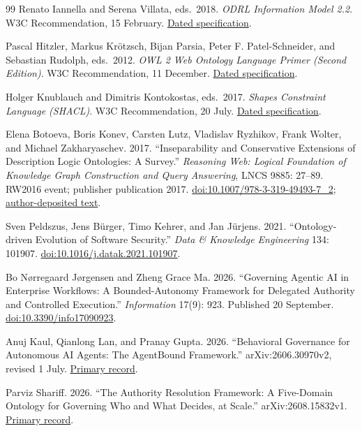 \documentclass[
  english,
  12pt,
  a4paper,
  preprint,
  numbers,
  nopreprintline]{elsarticle}
\begin{document}
\begin{thebibliography}{99}
Renato Iannella and Serena Villata, eds.~2018. \emph{ODRL Information
Model 2.2}. W3C Recommendation, 15 February.
\href{https://www.w3.org/TR/2018/REC-odrl-model-20180215/}{Dated
specification}.

Pascal Hitzler, Markus Krötzsch, Bijan Parsia, Peter F. Patel-Schneider,
and Sebastian Rudolph, eds.~2012. \emph{OWL 2 Web Ontology Language
Primer (Second Edition)}. W3C Recommendation, 11 December.
\href{https://www.w3.org/TR/2012/REC-owl2-primer-20121211/}{Dated
specification}.

Holger Knublauch and Dimitris Kontokostas, eds.~2017. \emph{Shapes
Constraint Language (SHACL)}. W3C Recommendation, 20 July.
\href{https://www.w3.org/TR/2017/REC-shacl-20170720/}{Dated
specification}.

Elena Botoeva, Boris Konev, Carsten Lutz, Vladislav Ryzhikov, Frank
Wolter, and Michael Zakharyaschev. 2017. ``Inseparability and
Conservative Extensions of Description Logic Ontologies: A Survey.''
\emph{Reasoning Web: Logical Foundation of Knowledge Graph Construction
and Query Answering}, LNCS 9885: 27--89. RW2016 event; publisher
publication 2017.
\href{https://doi.org/10.1007/978-3-319-49493-7_2}{doi:10.1007/978-3-319-49493-7\_2};
\href{https://arxiv.org/abs/1804.07805}{author-deposited text}.

Sven Peldszus, Jens Bürger, Timo Kehrer, and Jan Jürjens. 2021.
``Ontology-driven Evolution of Software Security.'' \emph{Data \&
Knowledge Engineering} 134: 101907.
\href{https://doi.org/10.1016/j.datak.2021.101907}{doi:10.1016/j.datak.2021.101907}.

Bo Nørregaard Jørgensen and Zheng Grace Ma. 2026. ``Governing Agentic AI
in Enterprise Workflows: A Bounded-Autonomy Framework for Delegated
Authority and Controlled Execution.'' \emph{Information} 17(9): 923.
Published 20 September.
\href{https://doi.org/10.3390/info17090923}{doi:10.3390/info17090923}.

Anuj Kaul, Qianlong Lan, and Pranay Gupta. 2026. ``Behavioral Governance
for Autonomous AI Agents: The AgentBound Framework.''
arXiv:2606.30970v2, revised 1 July.
\href{https://arxiv.org/abs/2606.30970v2}{Primary record}.

Parviz Shariff. 2026. ``The Authority Resolution Framework: A
Five-Domain Ontology for Governing Who and What Decides, at Scale.''
arXiv:2608.15832v1. \href{https://arxiv.org/abs/2608.15832v1}{Primary
record}.


\end{thebibliography}
\end{document}
